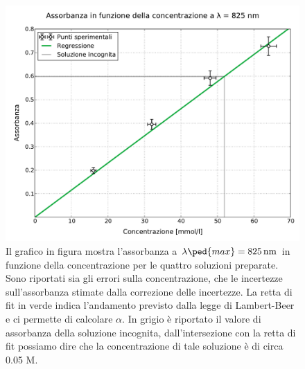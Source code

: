 \begin{figure}
    \includegraphics[scale=0.55]{retta.pdf}
    \caption{Il grafico in figura mostra l'assorbanza a $\lambda\ped{max} = \SI{825}{nm}$ in funzione della concentrazione
        per le quattro soluzioni preparate. Sono riportati sia gli errori sulla concentrazione, che le incertezze sull'assorbanza
        stimate dalla correzione delle incertezze. La retta di fit in verde 
        indica l'andamento previsto dalla legge di Lambert-Beer e ci permette di calcolare $\alpha$. In grigio è riportato
        il valore di assorbanza della soluzione incognita, dall'intersezione con la retta di fit possiamo dire che la concentrazione
        di tale soluzione è di circa 0.05 M.}
    \label{fig:a_vs_c}
\end{figure}
